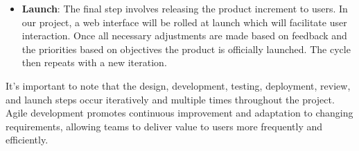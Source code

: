 \begin{itemize}
  \item \textbf{Launch}:
        The final step involves releasing the product increment to users. In our project, a web interface will be rolled at launch which will facilitate user interaction.
        Once all necessary adjustments are made based on feedback and the priorities based on objectives the product is officially launched. The cycle then repeats with a new iteration.\\
\end{itemize}

It's important to note that the design, development, testing, deployment, review, and launch steps occur iteratively and multiple times throughout the project. Agile development promotes continuous improvement and adaptation to changing requirements, allowing teams to deliver value to users more frequently and efficiently.\\



\pagebreak






